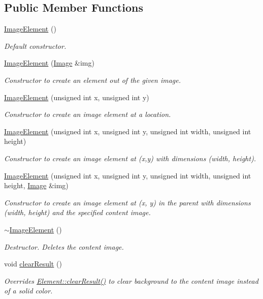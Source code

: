 \subsection*{Public Member Functions}
\begin{DoxyCompactItemize}
\item 
\hyperlink{class_image_element_a74aff4a808a295c0557f9c4dbedbc50a}{Image\-Element} ()
\begin{DoxyCompactList}\small\item\em Default constructor. \end{DoxyCompactList}\item 
\hyperlink{class_image_element_aba9605d67c75b2802a45e93a4b0cff5d}{Image\-Element} (\hyperlink{class_image}{Image} \&img)
\begin{DoxyCompactList}\small\item\em Constructor to create an element out of the given image. \end{DoxyCompactList}\item 
\hyperlink{class_image_element_a2a1f13235bc96229d3257212b3c62c79}{Image\-Element} (unsigned int x, unsigned int y)
\begin{DoxyCompactList}\small\item\em Constructor to create an image element at a location. \end{DoxyCompactList}\item 
\hyperlink{class_image_element_a9661aca27d32e6b9252dbbe45417f1bf}{Image\-Element} (unsigned int x, unsigned int y, unsigned int width, unsigned int height)
\begin{DoxyCompactList}\small\item\em Constructor to create an image element at (x,y) with dimensions (width, height). \end{DoxyCompactList}\item 
\hyperlink{class_image_element_a63993109c5c8e49f95c25ca13a887f1e}{Image\-Element} (unsigned int x, unsigned int y, unsigned int width, unsigned int height, \hyperlink{class_image}{Image} \&img)
\begin{DoxyCompactList}\small\item\em Constructor to create an image element at (x, y) in the parent with dimensions (width, height) and the specified content image. \end{DoxyCompactList}\item 
\hyperlink{class_image_element_a81b8b2d06cb668413254f7bc399bcb97}{$\sim$\-Image\-Element} ()
\begin{DoxyCompactList}\small\item\em Destructor. Deletes the content image. \end{DoxyCompactList}\item 
void \hyperlink{class_image_element_aa785ef26786dc59b0e66a71e465b3e31}{clear\-Result} ()
\begin{DoxyCompactList}\small\item\em Overrides \hyperlink{class_element_a7a110bce4630cd7b35b1c2d401774598}{Element\-::clear\-Result()} to clear background to the content image instead of a solid color. \end{DoxyCompactList}\end{DoxyCompactItemize}
